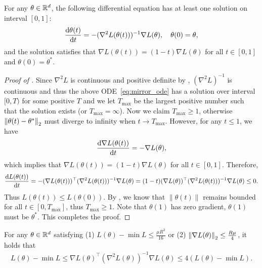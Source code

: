 \begin{lemma}\label{lem:soln_existence_mirror_ode}
	For any $\theta\in\mathbb{R}^d$, the following differential equation has at least one solution on interval $[0,1]$:
	\begin{align}\label{eq:mirror_ode}
		\frac{\mathrm{d} \theta(t)}{\mathrm{d} t} = - (\nabla^2 L(\theta(t)))^{-1} \nabla L(\theta), \quad \theta(0)=\theta,
	\end{align}
	and the solution satisfies that $\nabla L(\theta(t)) = (1-t)\nabla L(\theta)$ for all $t\in[0,1]$ and $\theta(0)=\theta^*$.
\end{lemma}
\begin{proof}[Proof of ]
	Since $\nabla^2 L$ is continuous and positive definite by  , $(\nabla^2 L)^{-1}$ is continuous and thus the above ODE~\eqref{eq:mirror_ode} has a solution over interval $[0,T)$ for some positive $T$ and we let $T_{\max}$ be the largest positive number such that the solution exists (or $T_{\max}=\infty$). Now we claim $T_{\max}\ge 1$, otherwise $\left\|\theta(t)-\theta^*\right\|_2$ must diverge to infinity when $t\to T_{\max}$. However, for any $t\le 1$, we have 
	\begin{align}
	\frac{\mathrm{d} \nabla L(\theta(t))}{\mathrm{d} t} = -  \nabla L(\theta),
	\end{align}
	which implies that $\nabla L(\theta(t)) = (1-t)\nabla L(\theta)$ for all $t\in[0,1]$. Therefore,
	\begin{align}
	\frac{\mathrm{d} L(\theta(t))}{\mathrm{d} t} = - 	(\nabla L(\theta(t)))^\top (\nabla^2 L(\theta(t)))^{-1} \nabla L(\theta) =(1-t)	(\nabla L(\theta))^\top (\nabla^2 L(\theta(t)))^{-1} \nabla L(\theta)\le 0.
	\end{align}
	Thus $L(\theta(t))\le L(\theta(0))$. By , we know that $\|\theta(t)\|$ remains bounded for all $t\in[0,T_{\max}]$, thus $T_{\max}\ge 1$. Note that  $\theta(1)$ has zero gradient, $\theta(1)$ must be $\theta^*$. This completes the proof. 
\end{proof}


\begin{lemma}\label{lem:small_loss_or_gradient_imply_loss_approx}
For any $\theta\in\mathbb{R}^d$ satisfying (1) $L(\theta)-\min L\le \frac{\mu R^2}{16}$ or (2) $\left\|\nabla L (\theta)\right\|_2 \le \frac{R\mu}{4}$, it holds that \begin{align}
L(\theta) - \min L	\le \nabla L(\theta)^\top (\nabla^2 L(\theta))^{-1}\nabla L(\theta) \le  4(L(\theta) - \min L).
 \end{align}
\end{lemma}


